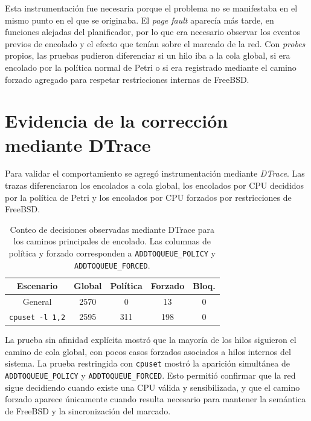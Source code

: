 Esta instrumentación fue necesaria porque el problema no se manifestaba en el mismo punto en el que se originaba. El \textit{page fault} aparecía más tarde, en funciones alejadas del planificador, por lo que era necesario observar los eventos previos de encolado y el efecto que tenían sobre el marcado de la red. Con \textit{probes} propios, las pruebas pudieron diferenciar si un hilo iba a la cola global, si era encolado por la política normal de Petri o si era registrado mediante el camino forzado agregado para respetar restricciones internas de FreeBSD.\par

\section{Evidencia de la corrección mediante DTrace}

Para validar el comportamiento se agregó instrumentación mediante \textit{DTrace}. Las trazas diferenciaron los encolados a cola global, los encolados por CPU decididos por la política de Petri y los encolados por CPU forzados por restricciones de FreeBSD.\par

\begin{table}[H]
    \centering
    \begin{tabular}{|c|c|c|c|c|}
        \hline
        \textbf{Escenario} & \textbf{Global} & \textbf{Política} & \textbf{Forzado} & \textbf{Bloq.} \\
        \hline
        General & 2570 & 0 & 13 & 0 \\
        \hline
        \texttt{cpuset -l 1,2} & 2595 & 311 & 198 & 0 \\
        \hline
    \end{tabular}
    \caption[Conteo de decisiones de encolado con DTrace]{Conteo de decisiones observadas mediante DTrace para los caminos principales de encolado. Las columnas de política y forzado corresponden a \texttt{ADDTOQUEUE\_POLICY} y \texttt{ADDTOQUEUE\_FORCED}.}
    \label{tabla:addtoqueue-forced-dtrace-appendix}
\end{table}

La prueba sin afinidad explícita mostró que la mayoría de los hilos siguieron el camino de cola global, con pocos casos forzados asociados a hilos internos del sistema. La prueba restringida con \verb|cpuset| mostró la aparición simultánea de \verb|ADDTOQUEUE_POLICY| y \verb|ADDTOQUEUE_FORCED|. Esto permitió confirmar que la red sigue decidiendo cuando existe una CPU válida y sensibilizada, y que el camino forzado aparece únicamente cuando resulta necesario para mantener la semántica de FreeBSD y la sincronización del marcado.\par

